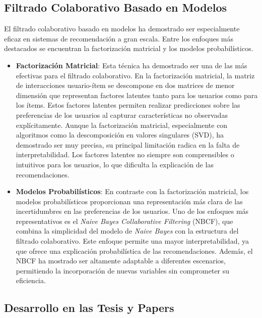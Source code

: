 \documentclass[runningheads,a4paper]{llncs}
\begin{document}
 
\subsection{Filtrado Colaborativo Basado en Modelos}
 
El filtrado colaborativo basado en modelos ha 
demostrado ser especialmente eficaz en sistemas de 
recomendación a gran escala. Entre los enfoques más 
destacados se encuentran la factorización matricial y
los modelos probabilísticos.

\begin{itemize}
    \item \textbf{Factorización Matricial}:
    Esta técnica ha demostrado ser una de las más 
    efectivas para el filtrado colaborativo. 
    En la factorización matricial, la matriz de 
    interacciones usuario-ítem se descompone en dos 
    matrices de menor dimensión que representan 
    factores latentes tanto para los usuarios como 
    para los ítems. Estos factores latentes permiten 
    realizar predicciones sobre las preferencias de 
    los usuarios al capturar características no 
    observadas explícitamente. Aunque la factorización 
    matricial, especialmente con algoritmos como la 
    descomposición en valores singulares (SVD), 
    ha demostrado ser muy precisa, su principal 
    limitación radica en la falta de interpretabilidad. 
    Los factores latentes no siempre son comprensibles
    o intuitivos para los usuarios, lo que dificulta
    la explicación de las recomendaciones. \cite{tesis_sistema_recomendador_hibrido}
    \item \textbf{Modelos Probabilísticos}:
    En contraste con la factorización matricial, 
    los modelos probabilísticos proporcionan una 
    representación más clara de las incertidumbres 
    en las preferencias de los usuarios. Uno de los 
    enfoques más representativos es el \textit{Naive Bayes 
    Collaborative Filtering} (NBCF), que combina la 
    simplicidad del modelo de \textit{Naive Bayes} con la 
    estructura del filtrado colaborativo. Este 
    enfoque permite una mayor interpretabilidad, 
    ya que ofrece una explicación probabilística de 
    las recomendaciones. Además, el NBCF ha mostrado 
    ser altamente adaptable a diferentes escenarios, 
    permitiendo la incorporación de nuevas variables 
    sin comprometer su eficiencia. \cite{tesis_sistema_recomendador_hibrido}

\end{itemize}

\subsection{Desarrollo en las Tesis y Papers} 
\end{document}
